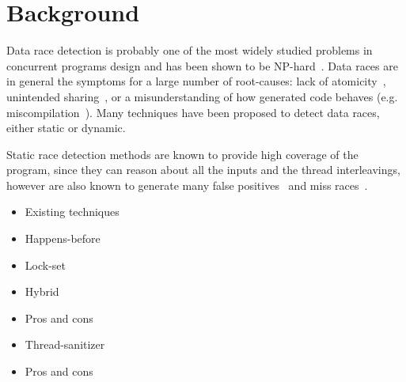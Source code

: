 \section{Background}
\label{sec:background}

Data race detection is probably one of the most widely studied problems in
concurrent programs design and has been shown to be
NP-hard~\cite{netzer-miller}.
%
Data races are in general the symptoms for a large number of root-causes: lack
of atomicity~\cite{usenix-race-erickson-et-al}, unintended
sharing~\cite{race-rv-2012-talk}, or a misunderstanding of how generated code
behaves (e.g. miscompilation~\cite{Boehm:2011:MPB:2001252.2001255}).
%
Many techniques have been proposed to detect data races, either static or
dynamic.

Static race detection methods are known to provide high coverage of the
program, since they can reason about all the inputs and the thread
interleavings, however are also known to generate many false
positives~\cite{Pratikakis:2011:LPS:1889997.1890000} and miss
races~\cite{Voung:2007:RSR:1287624.1287654}.

\begin{itemize}
\item Existing techniques
\item Happens-before
\item Lock-set
\item Hybrid
\item Pros and cons
\item Thread-sanitizer
\item Pros and cons
\end{itemize}

